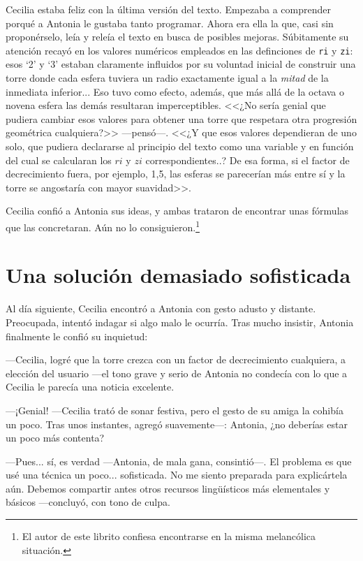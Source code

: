 Cecilia estaba feliz con la última versión del texto. Empezaba a
comprender porqué a Antonia le gustaba tanto programar. Ahora era ella
la que, casi sin proponérselo, leía y releía el texto en busca de
posibles mejoras. Súbitamente su atención recayó en los valores
numéricos empleados en las definciones de \texttt{ri} y \texttt{zi}:
esos `2' y `3' estaban claramente influidos por su voluntad inicial de
construir una torre donde cada esfera tuviera un radio exactamente
igual a la \emph{mitad} de la inmediata inferior... Eso tuvo como
efecto, además, que más allá de la octava o novena esfera las demás
resultaran imperceptibles. <<¿No sería genial que pudiera cambiar esos
valores para obtener una torre que respetara otra progresión
geométrica cualquiera?>> ---pensó---. <<¿Y que esos valores
dependieran de uno solo, que pudiera declararse al principio del texto
como una variable y en función del cual se calcularan los $ri$ y $zi$
correspondientes..? De esa forma, si el factor de decrecimiento fuera,
por ejemplo, 1,5, las esferas se parecerían más entre sí y la torre se
angostaría con mayor suavidad>>.

Cecilia confió a Antonia sus ideas, y ambas trataron de encontrar unas
fórmulas que las concretaran. Aún no lo consiguieron.\footnote{El autor
  de este librito confiesa encontrarse en la misma melancólica
  situación.}

\section{Una solución demasiado sofisticada}

Al día siguiente, Cecilia encontró a Antonia con gesto adusto y
distante. Preocupada, intentó indagar si algo malo le ocurría. Tras
mucho insistir, Antonia finalmente le confió su inquietud:

---Cecilia, logré que la torre crezca con un factor de
  decrecimiento cualquiera, a elección del usuario ---el tono
grave y serio de Antonia no condecía con lo que a Cecilia le parecía
una noticia excelente.

---¡Genial! ---Cecilia trató de sonar festiva, pero el gesto de su
amiga la cohibía un poco. Tras unos instantes, agregó
sua\-ve\-men\-te---: Antonia, ¿no deberías estar un poco más contenta?

---Pues... sí, es verdad ---Antonia, de mala gana, con\-sin\-\mbox{tió---.} El
problema es que usé una técnica un poco... sofisticada. No me siento
preparada para explicártela aún. Debemos compartir antes otros
recursos lingüísticos más elementales y básicos ---concluyó, con tono
de culpa.

